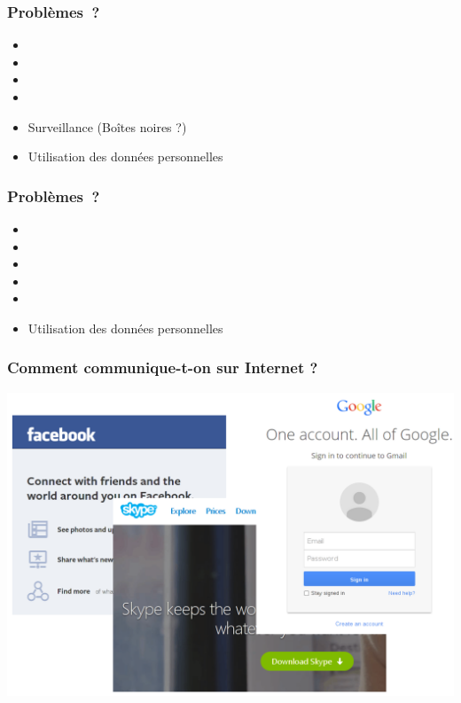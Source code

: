 \documentclass[notes=hide]{beamer}
\begin{document}
\begin{frame}
		  \frametitle{\textcolor{titre}{Problèmes~?}}
					 \begin{itemize}
								\item
								\item
								\item
								\item
								\item Surveillance (Boîtes noires ?)
								\item Utilisation des données personnelles
					\end{itemize}
\end{frame}

\begin{frame}
		  \frametitle{\textcolor{titre}{Problèmes~?}}
					 \begin{itemize}
								\item
								\item
								\item
								\item
								\item
								\item Utilisation des données personnelles
					\end{itemize}
\end{frame}

\begin{frame}[t,plain]
\begin{center}
\vspace{\fill}
	   \vspace{\fill}
\end{center}
\end{frame}

\begin{frame}[t,plain]
\begin{center}
\vspace{\fill}
	   \vspace{\fill}
\end{center}
\end{frame}
\begin{frame}[t]
		  \frametitle{\textcolor{titre}{Comment communique-t-on sur Internet ?}}
\begin{center}
\vfill
\includegraphics[width=.7\textwidth]{img2/15a-capture-gmailfbskype.png}
\vfill
\end{center}
\end{frame}
\end{document}
